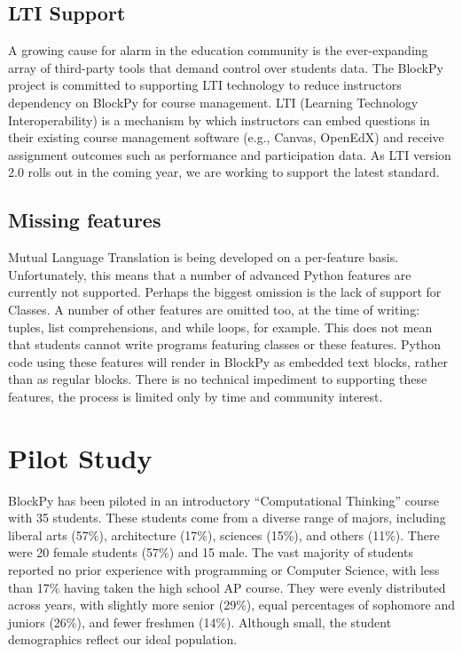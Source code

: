 \documentclass{sig-alternate}
\begin{document}
\subsection{LTI Support}

A growing cause for alarm in the education community is the ever-expanding array of third-party tools that demand control over students data.
The BlockPy project is committed to supporting LTI technology to reduce instructors dependency on BlockPy for course management.
LTI (Learning Technology Interoperability) is a mechanism by which instructors can embed questions in their existing course management software (e.g., Canvas, OpenEdX) and receive assignment outcomes such as performance and participation data.
As LTI version 2.0 rolls out in the coming year, we are working to support the latest standard.

\subsection{Missing features}

Mutual Language Translation is being developed on a per-feature basis.
Unfortunately, this means that a number of advanced Python features are currently not supported.
Perhaps the biggest omission is the lack of support for Classes.
A number of other features are omitted too, at the time of writing: tuples, list comprehensions, and while loops, for example.
This does not mean that students cannot write programs featuring classes or these features.
Python code using these features will render in BlockPy as embedded text blocks, rather than as regular blocks.
There is no technical impediment to supporting these features, the process is limited only by time and community interest.

\section{Pilot Study}

BlockPy has been piloted in an introductory ``Computational Thinking'' course with 35 students.
These students come from a diverse range of majors, including liberal arts (57\%), architecture (17\%),  sciences (15\%), and others (11\%).
There were 20 female students (57\%) and 15 male.
The vast majority of students reported no prior experience with programming or Computer Science, with less than 17\% having taken the high school AP course.
They were evenly distributed across years, with slightly more senior (29\%), equal percentages of sophomore and juniors (26\%), and fewer freshmen (14\%).
Although small, the student demographics reflect our ideal population. 
\end{document}
